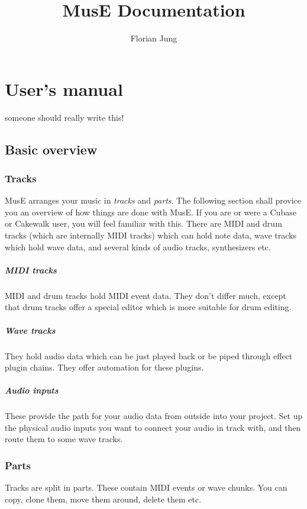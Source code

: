 \documentclass[a4paper]{report}
\author{Florian Jung}
\title{MusE Documentation}
\begin{document}
\chapter{User's manual}
someone should really write this!

\section{Basic overview}
\subsection{Tracks}
MusE arranges your music in \emph{tracks} and \emph{parts}. The following
section shall provice you an overview of how things are done with MusE.
If you are or were a Cubase or Cakewalk user, you will feel familiar with
this. There are
MIDI and drum tracks (which are internally MIDI tracks) which can hold
note data, wave tracks which hold wave data, and several kinds of
audio tracks, synthesizers etc.

\paragraph{MIDI tracks}
MIDI and drum tracks hold MIDI event data. They don't differ much,
except that drum tracks offer a special editor which is more suitable
for drum editing.

\paragraph{Wave tracks}
They hold audio data which can be just played back or be piped through
effect plugin chains. They offer automation for these plugins.

\paragraph{Audio inputs}
These provide the path for your audio data from outside into your
project. Set up the physical audio inputs you want to connect your audio
in track with, and then route them to some wave tracks.

                                                                         
\subsection{Parts}
Tracks are split in parts. These contain MIDI events or wave chunks.
You can copy, clone them, move them around, delete them etc.
\end{document}
